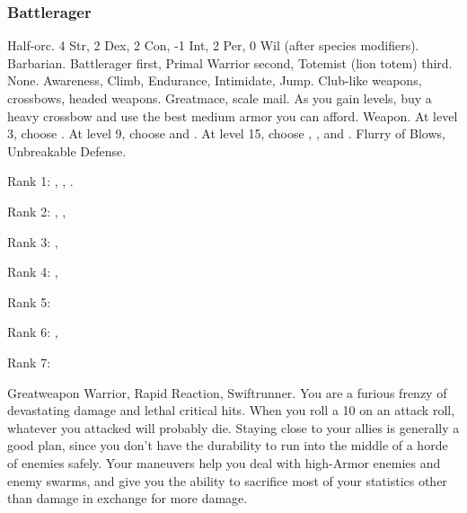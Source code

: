         \subsubsection{Battlerager}
             Half-orc.
             4 Str, 2 Dex, 2 Con, -1 Int, 2 Per, 0 Wil (after species modifiers).
             Barbarian.
             Battlerager first, Primal Warrior second, Totemist (lion totem) third.
             None.
             Awareness, Climb, Endurance, Intimidate, Jump.
             Club-like weapons, crossbows, headed weapons.
             Greatmace, scale mail. As you gain levels, buy a heavy crossbow and use the best medium armor you can afford.
             Weapon.
                At level 3, choose .
                At level 9, choose  and .
                At level 15, choose , , and .
             Flurry of Blows, Unbreakable Defense.
            \begin{raggeditemize}
                \item Rank 1: , , .
                \item Rank 2: , , 
                \item Rank 3: , 
                \item Rank 4: , 
                \item Rank 5: 
                \item Rank 6: , 
                \item Rank 7: 
            \end{raggeditemize}
             Greatweapon Warrior, Rapid Reaction, Swiftrunner.
             You are a furious frenzy of devastating damage and lethal critical hits.
            When you roll a 10 on an attack roll, whatever you attacked will probably die.
            Staying close to your allies is generally a good plan, since you don't have the durability to run into the middle of a horde of enemies safely.
            Your maneuvers help you deal with high-Armor enemies and enemy swarms, and give you the ability to sacrifice most of your statistics other than damage in exchange for more damage.

